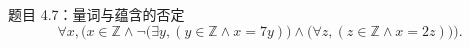 \begin{frame}{}
  \begin{exampleblock}{题目 4.7：量词与蕴含的否定}
    \[
      \forall x, \Big(x \in \mathbb{Z} \land \lnot\big(\exists y, (y \in \mathbb{Z} \land x = 7y)\big)
	\land \big(\forall z, (z \in \mathbb{Z} \land x = 2z)\big)\Big).
    \]

  \end{exampleblock}

  \vspace{0.30cm}

\end{frame}

\begin{frame}{}
\end{frame}

\begin{frame}{}
\end{frame}

\begin{frame}{}
\end{frame}

\begin{frame}{}
\end{frame}
